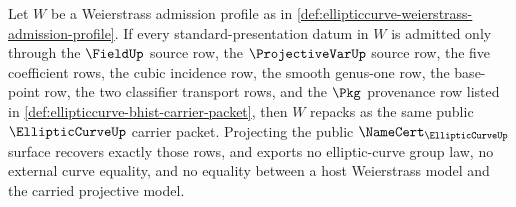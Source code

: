 \begin{theorem}
\label{thm:ellipticcurve-weierstrass-bridge-boundary}
Let $W$ be a Weierstrass admission profile as in \autoref{def:ellipticcurve-weierstrass-admission-profile}. If every standard-presentation datum in $W$ is admitted only through the $\FieldUp$ source row, the $\ProjectiveVarUp$ source row, the five coefficient rows, the cubic incidence row, the smooth genus-one row, the base-point row, the two classifier transport rows, and the $\Pkg$ provenance row listed in \autoref{def:ellipticcurve-bhist-carrier-packet}, then $W$ repacks as the same public $\EllipticCurveUp$ carrier packet. Projecting the public $\NameCert_{\EllipticCurveUp}$ surface recovers exactly those rows, and exports no elliptic-curve group law, no external curve equality, and no equality between a host Weierstrass model and the carried projective model.
\end{theorem}
